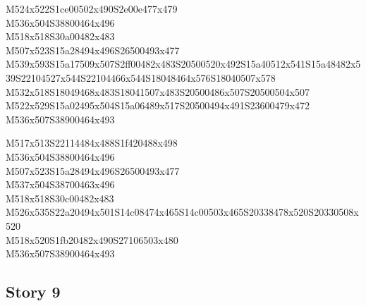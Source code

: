\documentclass{article}
\begin{document}
\begin{multicols}{5}
\begin{center}
M524x522S1ce00502x490S2e00e477x479 %
\\M536x504S38800464x496 %
\\M518x518S30a00482x483 %
\\M507x523S15a28494x496S26500493x477 %
\\M539x593S15a17509x507S2ff00482x483S20500520x492S15a40512x541S15a48482x539S22104527x544S22104466x544S18048464x576S18040507x578 %
\\M532x518S18049468x483S18041507x483S20500486x507S20500504x507 %
\\M522x529S15a02495x504S15a06489x517S20500494x491S23600479x472 %
\\M536x507S38900464x493 %
\vfil
\columnbreak

M517x513S22114484x488S1f420488x498 %
\\M536x504S38800464x496 %
\\M507x523S15a28494x496S26500493x477 %
\\M537x504S38700463x496 %
\\M518x518S30c00482x483 %
\\M526x535S22a20494x501S14c08474x465S14c00503x465S20338478x520S20330508x520 %
\\M518x520S1fb20482x490S27106503x480 %
\\M536x507S38900464x493 %
\vfil

\end{center}
\end{multicols}

\subsection{Story 9}
\end{document}
